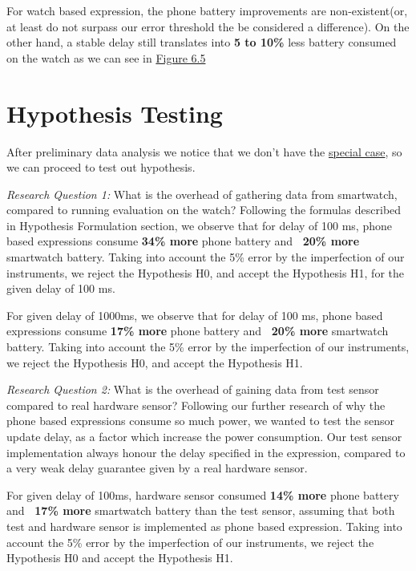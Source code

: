 For watch based expression, the phone battery improvements are non-existent(or, at least do not surpass our error threshold the be considered a difference). On the other hand,
a stable delay still translates into \textbf{ 5 to 10\%} less battery consumed on the watch as we can see in \hyperref[fig:wear_expr_consumption]{Figure 6.5}

\section{Hypothesis Testing}
After preliminary data analysis we notice that we don't have the \hyperref[special_case]{special case}, so we can proceed to test out hypothesis.

\textit{Research Question 1:} What is the overhead of gathering data from smartwatch, compared to running evaluation on the watch? \newline
Following the formulas described in Hypothesis Formulation section, we observe that for delay of 100 ms, phone based expressions consume 
\textbf{34\% more} phone battery and \textbf{~20\% more } smartwatch battery. Taking into account the 5\% error by the imperfection of our instruments,
we reject the Hypothesis H0, and accept the Hypothesis H1, for the given delay of 100 ms.

For given delay of 1000ms, we observe that for delay of 100 ms, phone based expressions consume 
\textbf{17\% more} phone battery and \textbf{~20\% more } smartwatch battery. Taking into account the 5\% error by the imperfection of our instruments,
we reject the Hypothesis H0, and accept the Hypothesis H1.

 \textit{Research Question 2:}  What is the overhead of gaining data from test sensor compared to real hardware sensor?\newline
Following our further research of why the phone based expressions consume so much power, we wanted to test the sensor update delay, as a factor
which increase the power consumption. Our test sensor implementation always honour the delay specified in the expression, compared to a very weak delay guarantee
given by a real hardware sensor.

For given delay of 100ms, hardware sensor consumed \textbf{14\% more} phone battery and \textbf{~17\% more } smartwatch battery than the test sensor, assuming that both test and hardware
sensor is implemented as phone based expression.
Taking into account the 5\% error by the imperfection of our instruments, we reject the Hypothesis H0 and accept the Hypothesis H1.

